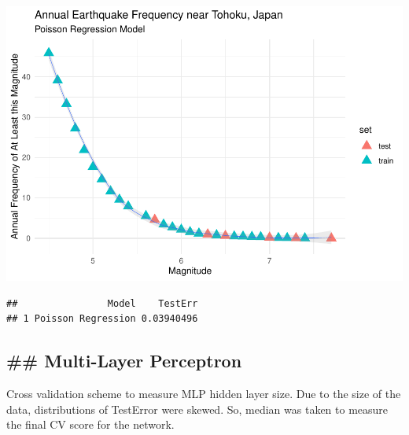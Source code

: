\documentclass[
]{article}
\newenvironment{Shaded}{\begin{snugshade}}{\end{snugshade}}
\newcommand{\AlertTok}[1]{\textcolor[rgb]{0.94,0.16,0.16}{#1}}
\newcommand{\AttributeTok}[1]{\textcolor[rgb]{0.77,0.63,0.00}{#1}}
\newcommand{\CommentTok}[1]{\textcolor[rgb]{0.56,0.35,0.01}{\textit{#1}}}
\newcommand{\DecValTok}[1]{\textcolor[rgb]{0.00,0.00,0.81}{#1}}
\newcommand{\FunctionTok}[1]{\textcolor[rgb]{0.00,0.00,0.00}{#1}}
\newcommand{\NormalTok}[1]{#1}
\newcommand{\OtherTok}[1]{\textcolor[rgb]{0.56,0.35,0.01}{#1}}
\newcommand{\SpecialCharTok}[1]{\textcolor[rgb]{0.00,0.00,0.00}{#1}}
\newcommand{\StringTok}[1]{\textcolor[rgb]{0.31,0.60,0.02}{#1}}
\begin{document}
\includegraphics{Appendix_eq_files/figure-latex/unnamed-chunk-3-1.pdf}

\begin{Shaded}
\end{Shaded}

\begin{verbatim}
##                Model    TestErr
## 1 Poisson Regression 0.03940496
\end{verbatim}

\hypertarget{multi-layer-perceptron}{%
\subsection{\#\# Multi-Layer Perceptron}\label{multi-layer-perceptron}}

Cross validation scheme to measure MLP hidden layer size. Due to the
size of the data, distributions of TestError were skewed. So, median was
taken to measure the final CV score for the network.
\end{document}
